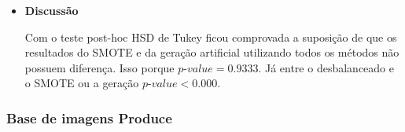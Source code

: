 \begin{itemize}
\item[] \textbf{Discussão}

Com o teste post-hoc HSD de Tukey ficou comprovada a suposição de que os resultados do SMOTE e da geração artificial utilizando todos os métodos não possuem diferença. Isso porque $\textit{p-value} = 0.9333$. Já entre o desbalanceado e o SMOTE ou a geração $\textit{p-value} < 0.000$.


\end{itemize}

\subsubsection{Base de imagens Produce}

